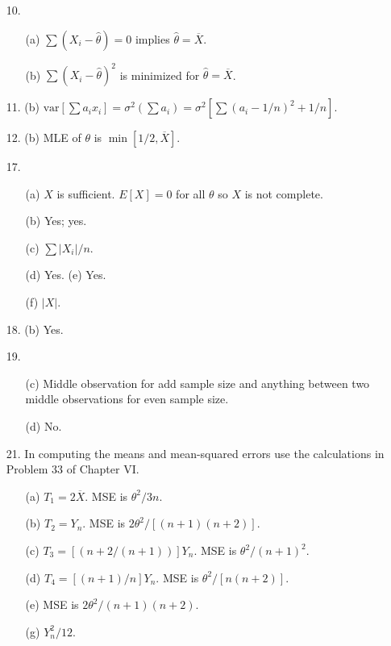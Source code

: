 \begin{enumerate}
	\item[10.] \begin{enumerate}
		\item[(a)] $\sum(X_i - \hat{\theta}) = 0$ implies $\hat{\theta}=\overline{X}$.
		\item[(b)] $\sum(X_i - \hat{\theta})^2$ is minimized for $\hat{\theta}=\overline{X}$.
	\end{enumerate}
	
	\item[11.] (b) $\mbox{var}[\sum a_ix_i] = \sigma^2(\sum a_i) = \sigma^2[\sum(a_i-1/n)^2 + 1/n]$.
	
	\item[12.] (b) MLE of $\theta$ is $\min[1/2, \overline{X}]$.
	  
	 \newpage
	 
	 \item[17.] \begin{enumerate}
	 	\item[(a)] $X$ is sufficient. $E[X]=0$ for all $\theta$ so $X$ is not complete.
	 	\item[(b)] Yes; yes.
	 	\item[(c)] $\sum \vert X_i\vert/n$.
	 	\item[(d)] Yes. (e) Yes.
		\item[(f)] $\vert X\vert$.
	\end{enumerate}
		
	\item[18.] (b) Yes.
	
	\item[19.] \begin{enumerate}
		\item[(c)] Middle observation for add sample size and anything between two middle observations for even sample size.
		\item[(d)] No.
	\end{enumerate}
	
	\item[21.] In computing the means and mean-squared errors use the calculations in Problem 33 of Chapter VI.
	\begin{enumerate}
		\item[(a)] $T_1 = 2\overline{X}$. MSE is $\theta^2/3n$.
		\item[(b)] $T_2 = Y_n$. MSE is $2\theta^2/[(n+1)(n+2)]$.
		\item[(c)] $T_3 = [(n+2/(n+1))]Y_n.$ MSE is $\theta^2/(n+1)^2$.
		\item[(d)] $T_4 = [(n+1)/n]Y_n.$ MSE is $\theta^2/[n(n+2)]$.
		\item[(e)] MSE is $2\theta^2/(n+1)(n+2)$.
		\item[(g)] $Y_n^2/12$.
	\end{enumerate}
	

\end{enumerate}

